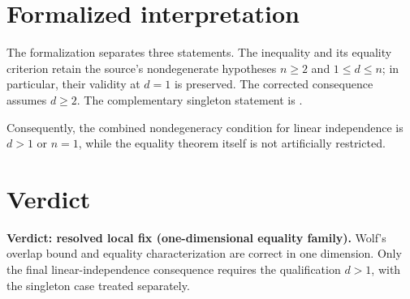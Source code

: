 \documentclass{article}
\begin{document}
\section{Formalized interpretation}

The formalization separates three statements. The inequality
 and its equality criterion
 retain the source's
nondegenerate hypotheses $n\ge2$ and $1\le d\le n$; in particular, their
validity at $d=1$ is preserved. The corrected consequence
 assumes $d\ge2$.
The complementary singleton statement is
.

Consequently, the combined nondegeneracy condition for linear independence is
$d>1$ or $n=1$, while the equality theorem itself is not artificially
restricted.

\section{Verdict}

\textbf{Verdict: resolved local fix (one-dimensional equality family).}
Wolf's overlap bound and equality characterization are correct in one
dimension. Only the final linear-independence consequence requires the
qualification $d>1$, with the singleton case treated separately.



\end{document}
